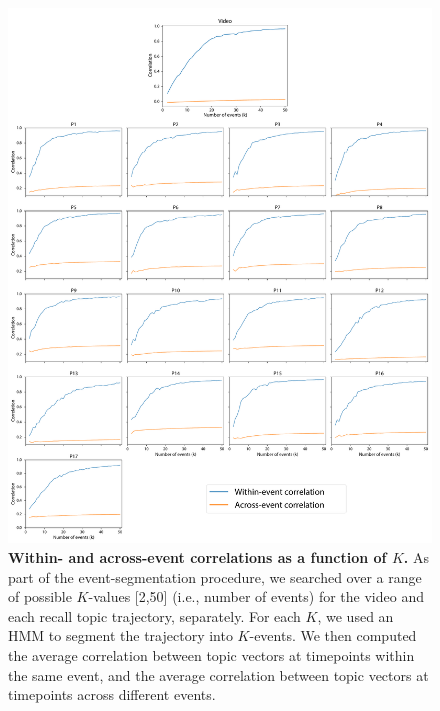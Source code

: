 \documentclass{article}
\begin{document}
\begin{figure}[p!]
\centering
\includegraphics[width=\textwidth]{figs/k_corrs}
\caption{\small \textbf{Within- and across-event correlations as a function of $K$.}  As part of the event-segmentation procedure, we searched over a range of possible $K$-values [2,50] (i.e., number of events) for the video and each recall topic trajectory, separately.  For each $K$, we used an HMM to segment the trajectory into $K$-events. We then computed the average correlation between topic vectors at timepoints within the same event, and the average correlation between topic vectors at timepoints across different events.}
\label{fig:k_corrs}
\end{figure}

\end{document}
